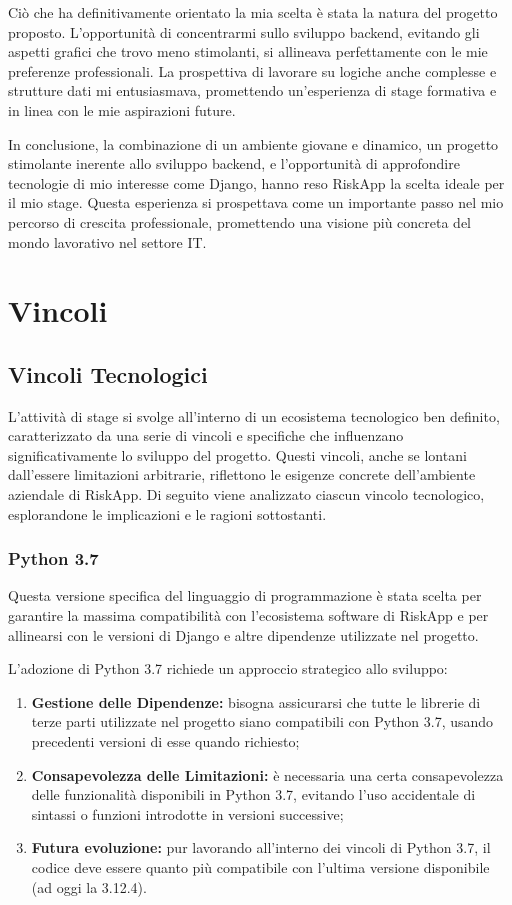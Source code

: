 Ciò che ha definitivamente orientato la mia scelta è stata la natura del progetto proposto. L'opportunità di concentrarmi sullo sviluppo backend, evitando gli aspetti grafici che trovo meno stimolanti, si allineava perfettamente con le mie preferenze professionali. La prospettiva di lavorare su logiche anche complesse e strutture dati mi entusiasmava, promettendo un'esperienza di stage formativa e in linea con le mie aspirazioni future.

In conclusione, la combinazione di un ambiente giovane e dinamico, un progetto stimolante inerente allo sviluppo backend, e l'opportunità di approfondire tecnologie di mio interesse come Django, hanno reso RiskApp la scelta ideale per il mio stage. Questa esperienza si prospettava come un importante passo nel mio percorso di crescita professionale, promettendo una visione più concreta del mondo lavorativo nel settore IT.

\section{Vincoli}
	\subsection{Vincoli Tecnologici}
	
	L'attività di stage si svolge all'interno di un ecosistema tecnologico ben definito, caratterizzato da una serie di vincoli e specifiche che influenzano significativamente lo sviluppo del progetto. Questi vincoli, anche se lontani dall'essere limitazioni arbitrarie, riflettono le esigenze concrete dell'ambiente aziendale di RiskApp. Di seguito viene analizzato ciascun vincolo tecnologico, esplorandone le implicazioni e le ragioni sottostanti.
	
		\subsubsection{Python 3.7}
		Questa versione specifica del linguaggio di programmazione è stata scelta per garantire la massima compatibilità con l'ecosistema software di RiskApp e per allinearsi con le versioni di Django e altre dipendenze utilizzate nel progetto.
		
		L'adozione di Python 3.7 richiede un approccio strategico allo sviluppo:
		
		\begin{enumerate}
			\item \textbf{Gestione delle Dipendenze:} bisogna assicurarsi che tutte le librerie di terze parti utilizzate nel progetto siano compatibili con Python 3.7, usando precedenti versioni di esse quando richiesto;
			\item \textbf{Consapevolezza delle Limitazioni:} è necessaria una certa consapevolezza delle funzionalità disponibili in Python 3.7, evitando l'uso accidentale di sintassi o funzioni introdotte in versioni successive;
			\item \textbf{Futura evoluzione:} pur lavorando all'interno dei vincoli di Python 3.7, il codice deve essere quanto più compatibile con l'ultima versione disponibile (ad oggi la 3.12.4).
		\end{enumerate}
	
